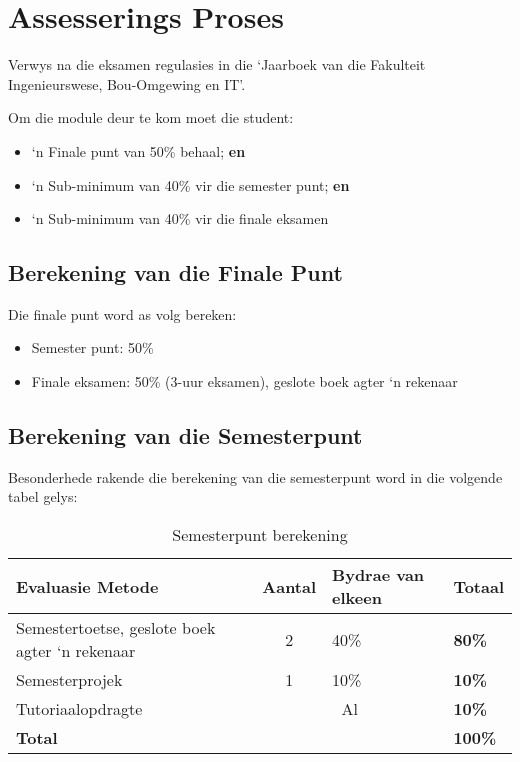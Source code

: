 \section{Assesserings Proses}
    Verwys na die eksamen regulasies in die `Jaarboek van die Fakulteit
    Ingenieurswese, Bou-Omgewing en IT'.

    Om die module deur te kom moet die student:
    \begin{itemize}
        \item `n Finale punt van 50\% behaal; {\bf en}
        \item `n Sub-minimum van 40\% vir die semester punt; {\bf en}
        \item `n Sub-minimum van 40\% vir die finale eksamen
    \end{itemize}

    \subsection{Berekening van die Finale Punt}
        Die finale punt word as volg bereken:
        \begin{itemize}
            \item Semester punt: 50\%
            \item Finale eksamen: 50\% (3-uur eksamen), geslote boek
              agter `n rekenaar
        \end{itemize}

    \subsection{Berekening van die Semesterpunt}
        Besonderhede rakende die berekening van die semesterpunt word in die
        volgende tabel gelys:
        \begin{table}[!h]
            \begin{center}
             \begin{tabular}{|p{5cm}|c|l|l|}
               \hline
               {\bf Evaluasie Metode} & {\bf Aantal} &
               {\bf Bydrae van elkeen} & {\bf Totaal} \\
               \hline
               Semestertoetse, geslote boek
               agter `n rekenaar
               & 2 & 40\% & {\bf 80\%} \\ \hline
               Semesterprojek
               & 1 & 10\% & {\bf 10\%} \\ \hline
               Tutoriaalopdragte
               & \multicolumn{2}{|c|}{Al} & {\bf 10\%} \\
               \hline
               \multicolumn{3}{|l|}{{\bf Total}} & {\bf 100\%} \\
               \hline
             \end{tabular}
             \caption{Semesterpunt berekening}
            \end{center}
        \end{table}

